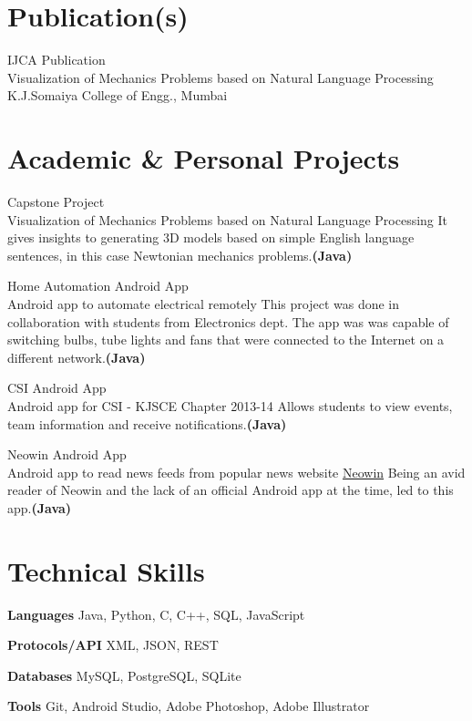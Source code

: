 \documentclass[10pt, a4paper, sans]{moderncv}
\begin{document}
\section{Publication(s)}
\cventry
{IJCA Publication \\
\href{http://www.ijcaonline.org/archives/volume116/number14/20408-2766}{\faFile}}
{Visualization of Mechanics Problems based on
Natural Language Processing}
{K.J.Somaiya College of Engg., Mumbai}
{}
{}
{}

\section{Academic \& Personal Projects}
\cventry
{Capstone Project \\ {\faGithub}}
{Visualization of Mechanics Problems based on
Natural Language Processing}
{}
{}
{}
{It gives insights to generating 3D models based on simple English language sentences, in this case Newtonian mechanics problems.\bfseries{(Java)}}

\cventry
{Home Automation Android App \\ {\faAndroid}}
{Android app to automate electrical remotely}
{}
{}
{}
{This project was done in collaboration with students from Electronics dept. The app was was capable of switching bulbs,  tube lights and fans that were connected to the Internet on a different network.\bfseries{(Java)}}

\cventry
{CSI Android App \\ {\faAndroid}}
{Android app for CSI - KJSCE Chapter 2013-14}
{}
{}
{}
{Allows students to view events, team information and receive notifications.\bfseries{(Java)}}

\cventry
{Neowin Android App \\ {\faAndroid}}
{Android app to read news feeds from popular news website \href{http://www.neowin.net/}{Neowin}}
{}
{}
{}
{Being an avid reader of Neowin and the lack of an official Android app at the time, led to this app.\bfseries{(Java)}}

\section{Technical Skills}
\cvitem
{\bfseries{Languages}}
{Java, Python, C, C++, SQL, JavaScript}

\cvitem
{\bfseries{Protocols/API}}
{XML, JSON, REST}

\cvitem
{\bfseries{Databases}}
{MySQL, PostgreSQL, SQLite}

\cvitem
{\bfseries{Tools}}
{Git, Android Studio, Adobe Photoshop, Adobe Illustrator}
\end{document}
